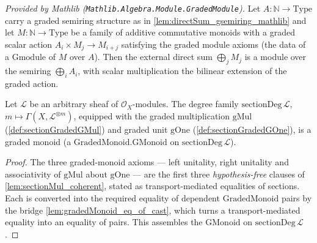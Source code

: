 \begin{lemma}
  \label{lem:directSum_gmodule_mathlib}
  \mathlibok
  \textit{Provided by Mathlib (\texttt{Mathlib.Algebra.Module.GradedModule}).}
  Let \(A : \mathbb{N} \to \mathrm{Type}\) carry a graded semiring structure as
  in \cref{lem:directSum_gsemiring_mathlib} and let
  \(M : \mathbb{N} \to \mathrm{Type}\) be a family of additive commutative
  monoids with a graded scalar action \(A_i \times M_j \to M_{i+j}\) satisfying
  the graded module axioms (the data of a \(\mathrm{Gmodule}\) of \(M\) over
  \(A\)). Then the external direct sum \(\bigoplus_j M_j\) is a module over the
  semiring \(\bigoplus_i A_i\), with scalar multiplication the bilinear
  extension of the graded action.
\end{lemma}

\begin{lemma}\leanok
  \label{lem:sectionGradedRing_gmonoid}
  Let \(\mathcal{L}\) be an arbitrary sheaf of \(\mathcal{O}_X\)-modules. The degree
  family \(\mathrm{sectionDeg}\,\mathcal{L}\), \(m \mapsto
  \Gamma(X,\mathcal{L}^{\otimes m})\), equipped with the graded multiplication
  \(\mathrm{gMul}\) (\cref{def:sectionGradedGMul}) and graded unit \(\mathrm{gOne}\)
  (\cref{def:sectionGradedGOne}), is a graded monoid (a
  \(\mathrm{GradedMonoid.GMonoid}\) on \(\mathrm{sectionDeg}\,\mathcal{L}\)).
\end{lemma}

\begin{proof}
  \leanok
  The three graded-monoid axioms --- left unitality, right unitality and
  associativity of \(\mathrm{gMul}\) about \(\mathrm{gOne}\) --- are the first three
  \emph{hypothesis-free} clauses of \cref{lem:sectionMul_coherent}, stated as
  transport-mediated equalities of sections. Each is converted into the required
  equality of dependent \(\mathrm{GradedMonoid}\) pairs by the bridge
  \cref{lem:gradedMonoid_eq_of_cast}, which turns a transport-mediated equality into an
  equality of pairs. This assembles the \(\mathrm{GMonoid}\) on
  \(\mathrm{sectionDeg}\,\mathcal{L}\).
\end{proof}


